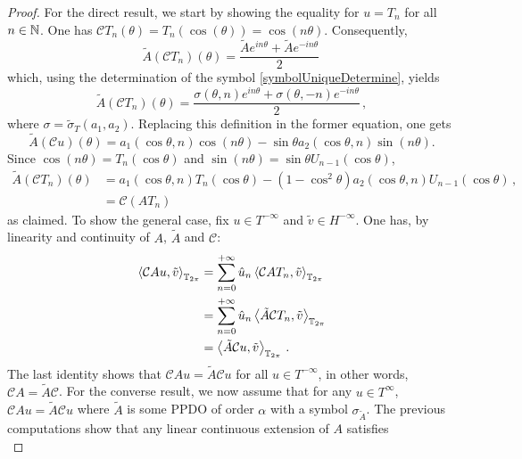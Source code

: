 \documentclass[a4paper]{article}
\begin{document}
\begin{proof}
	For the direct result, we start by showing the equality for $u = T_n$ for all $n \in \mathbb{N}$. One has $\mathcal{C}T_n(\theta) = T_n(\cos(\theta)) = \cos(n\theta)$. Consequently,
	\begin{equation}
	\label{debut}
		\tilde{A}\left(\mathcal{C}T_n\right)(\theta) = \frac{\tilde{A}e^{in\theta}+\tilde{A}e^{-in\theta}}{2}\,
	\end{equation}
	which, using the determination of the symbol \eqref{symbolUniqueDetermine}, yields
	\[\tilde{A}\left(\mathcal{C}T_n\right)(\theta) = \frac{ \sigma(\theta,n)e^{in\theta} + \sigma(\theta,-n)e^{-in\theta}}{2}\,,\]
	where $\sigma = \tilde{\sigma}_T(a_1,a_2)$. Replacing this definition in the former equation, one gets
	\[\tilde{A}\left(\mathcal{C}u\right)(\theta) = a_1(\cos\theta,n)\cos(n\theta) - \sin\theta a_2(\cos\theta,n)\sin(n\theta).\]
	Since $\cos(n\theta) = T_n(\cos\theta)$ and $\sin(n\theta) = \sin\theta U_{n-1}(\cos\theta)$,
	\begin{equation}
		\begin{split}
		\tilde{A}\left(\mathcal{C}T_n\right)(\theta) &= a_1(\cos\theta,n)T_n(\cos\theta) - (1-\cos^2 \theta) a_2(\cos\theta,n) U_{n-1}(\cos\theta)\,,\\
		& = \mathcal{C}(AT_n)
		\end{split}
		\label{fin}
	\end{equation}
	as claimed. To show the general case, fix $u\in T^{-\infty}$ and $\tilde{v} \in H^{-\infty}$. One has, by linearity and continuity of $A$, $\tilde{A}$ and $\mathcal{C}$:
	\[\begin{split}
	\left\langle \mathcal{C}A u,\tilde{v}\right\rangle_{\mathbb{T}_{2\pi}} &= \sum_{n = 0}^{+ \infty} \hat{u}_n \left\langle \mathcal{C}AT_n,\tilde{v}\right\rangle_{\mathbb{T}_{2\pi}}\\
	& =  \sum_{n = 0}^{+ \infty} \hat{u}_n \left\langle \tilde{A} \mathcal{C} T_n,\tilde{v}\right\rangle_{\mathbb{T}_{2\pi}}\\
	&= \left\langle \tilde{A} \mathcal{C}u,\tilde{v}\right\rangle_{\mathbb{T}_{2\pi}}\,.
	\end{split}\]
	The last identity shows that $\mathcal{C}A u = \tilde{A} \mathcal{C} u$ for all $u \in T^{-\infty}$, in other words, $\mathcal{C}A = \tilde{A} \mathcal{C}$. For the converse result, we now assume that for any $u \in T^{\infty}$, $\mathcal{C}Au = \tilde{A}\mathcal{C}u$ where $\tilde{A}$ is some PPDO of order $\alpha$ with a symbol $\sigma_{\tilde{A}}$. The previous computations show that any linear continuous extension of $A$ satisfies 
	\begin{equation}

\end{equation}
\end{proof}
\end{document}
